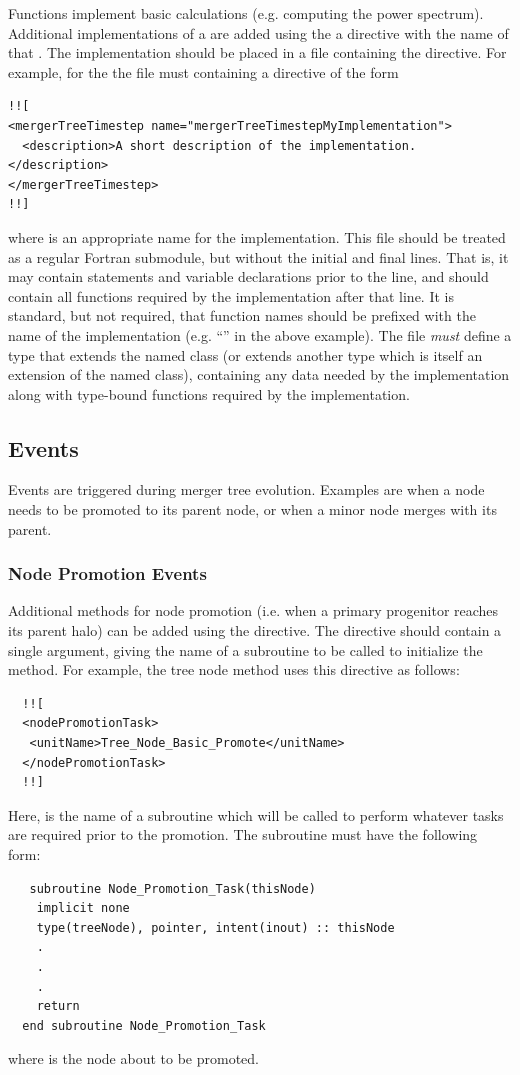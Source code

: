 Functions implement basic calculations (e.g. computing the power spectrum). Additional implementations of a  are added using the a directive with the name of that . The implementation should be placed in a file containing the directive. For example, for the   the file must containing a directive of the form
\begin{verbatim}
!![
<mergerTreeTimestep name="mergerTreeTimestepMyImplementation">
  <description>A short description of the implementation.</description>
</mergerTreeTimestep>
!!]
\end{verbatim}
where  is an appropriate name for the implementation. This file should be treated as a regular Fortran submodule, but without the initial  and final  lines. That is, it may contain  statements and variable declarations prior to the  line, and should contain all functions required by the implementation after that line. It is standard, but not required, that function names should be prefixed with the name of the implementation (e.g. ``'' in the above example). The file \emph{must} define a type that extends the named  class (or extends another type which is itself an extension of the named  class), containing any data needed by the implementation along with type-bound functions required by the implementation.

\subsection{Events}

Events are triggered during merger tree evolution. Examples are when a node needs to be promoted to its parent node, or when a minor node merges with its parent.

\subsubsection{Node Promotion Events}

Additional methods for node promotion (i.e. when a primary progenitor reaches its parent halo) can be added using the  directive. The directive should contain a single argument, giving the name of a subroutine to be called to initialize the method. For example, the  tree node method uses this directive as follows:
\begin{verbatim}
  !![
  <nodePromotionTask>
   <unitName>Tree_Node_Basic_Promote</unitName>
  </nodePromotionTask>
  !!]
\end{verbatim}
Here,  is the name of a subroutine which will be called to perform whatever tasks are required prior to the promotion. The subroutine must have the following form:
\begin{verbatim}
   subroutine Node_Promotion_Task(thisNode)
    implicit none
    type(treeNode), pointer, intent(inout) :: thisNode
    .
    .
    .
    return
  end subroutine Node_Promotion_Task
\end{verbatim}
where  is the node about to be promoted.

